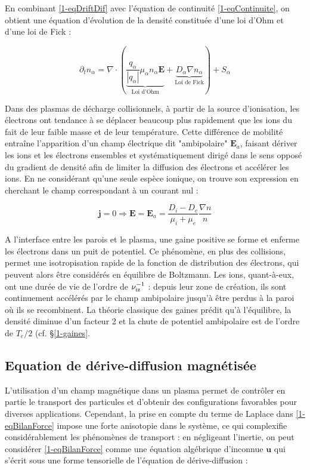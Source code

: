 \begin{refsection}
En combinant \eqref{1-eqDriftDif} avec l'équation de continuité
\eqref{1-eqContinuite}, on obtient une équation d'évolution de la densité
constituée d'une loi d'Ohm et d'une loi de Fick :
 
\begin{equation}
\label{1-eqDriftDifContinuite}
\partial_t
n_\alpha=\nabla\cdot(\underbrace{\frac{q_\alpha}{|q_\alpha|}\mu_\alpha n_\alpha\mathbf E}_\text{Loi d'Ohm}+\underbrace{D_\alpha{\nabla n_\alpha}}_\text{Loi
de Fick})+S_\alpha
\end{equation}

Dans des plasmas de décharge collisionnels, à partir de la source d'ionisation,
les électrons ont tendance à se déplacer beaucoup plus rapidement que les ions
du fait de leur faible masse et de leur température. Cette différence de
mobilité entraîne l'apparition d'un champ électrique dit "ambipolaire"
$\mathbf E_a$, faisant dériver les ions et les électrons ensembles et
systématiquement dirigé dans le sens opposé du gradient de densité afin de
limiter la diffusion des électrons et accélérer les ions. En ne considérant
qu'une seule espèce ionique, on trouve son expression en cherchant le champ
correspondant à un courant nul :
 
\begin{equation}
\label{1-eqEAmb}
\mathbf j=0 \Rightarrow \mathbf E=\mathbf
E_a=\frac{D_i-D_e}{\mu_i+\mu_e}\frac{\nabla n}{n}
\end{equation}

A l'interface entre les parois et le plasma, une gaine positive se
forme et enferme les électrons dans un puit de potentiel. Ce phénomène, en plus
des collisions, permet une isotropisation rapide de la fonction de distribution
des électrons, qui peuvent alors être considérés en équilibre de Boltzmann.
Les ions, quant-à-eux, ont une durée de vie de l'ordre de
$\nu_\text{iz}^{{-1}}$ : depuis leur zone de création, ils sont
continuement accélérés par le champ ambipolaire jusqu'à être perdus à la paroi
où ils se recombinent. La théorie classique des gaines prédit qu'à l'équilibre,
la densité diminue d'un facteur 2 et la chute de potentiel ambipolaire est
de l'ordre de $T_e/2$ (cf. \S\ref{1-gaines}.

\subsection{Equation de dérive-diffusion magnétisée}
\label{1-deriveDiffMag}
L'utilisation d'un champ magnétique dans un plasma permet de contrôler en partie
le transport des particules et d'obtenir des configurations favorables pour
diverses applications. Cependant, la prise en compte du terme de Laplace dans
\eqref{1-eqBilanForce} impose une forte anisotopie dans le système, ce qui
complexifie considérablement les phénomènes de transport : en
négligeant l'inertie, on peut considérer \eqref{1-eqBilanForce} comme une
équation algébrique d'inconnue $\mathbf u$ qui s'écrit sous une forme
tensorielle de l'équation de dérive-diffusion :


\end{refsection}
